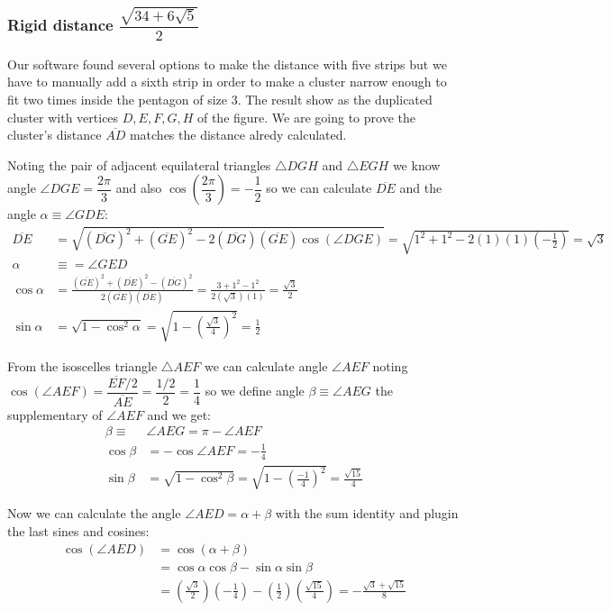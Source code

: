 \documentclass[11pt]{article}
\begin{document}
\subsubsection{Rigid distance  $\dfrac{\sqrt{34+6\sqrt5}}2$}

Our software found several options to make the distance with five strips but we have to manually add a sixth strip in order to make a cluster narrow enough to fit two times inside the pentagon of size $3$. The result show as the duplicated cluster with vertices $D,E,F,G,H$ of the figure. We are going to prove the cluster's distance $\overline{AD}$ matches the distance alredy calculated.

Noting the pair of adjacent equilateral triangles $\triangle{DGH}$ and $\triangle{EGH}$ we know angle $\angle{DGE} = \dfrac{2\pi}3$ and also $\cos\left(\dfrac{2\pi}3\right) = -\dfrac{1}2$ so we can calculate $\overline{DE}$ and the angle $\alpha \equiv \angle{GDE}$:
\begin{align}
\overline{DE} &= \sqrt{(\overline{DG})^2 + (\overline{GE})^2 
 - 2(\overline{DG})(\overline{GE})\cos(\angle{DGE})}
 = \sqrt{1^2 + 1^2 - 2(1)(1)\left(-\frac{1}2\right)} = \sqrt3\\
\alpha &\equiv = \angle{GED} \nonumber\\
\cos\alpha &= \frac{(\overline{GE})^2 + (\overline{DE})^2 - (\overline{DG})^2}
 {2(\overline{GE})(\overline{DE})}
 = \frac{3 + 1^2 - 1^2}{2(\sqrt3)(1)} = \frac{\sqrt3}2\\
\sin\alpha &= \sqrt{1 - \cos^2\alpha} = \sqrt{1 - \left(\frac{\sqrt3}4\right)^2} 
 = \frac{1}2
\end{align}

From the isoscelles triangle $\triangle{AEF}$ we can calculate angle $\angle{AEF}$ noting $\cos(\angle{AEF}) = \dfrac{\overline{EF}/2}{\overline{AE}} = \dfrac{1/2}{2} = \dfrac{1}4$ so we define angle $\beta \equiv \angle{AEG}$ the supplementary of $\angle{AEF}$ and we get:
\begin{align}
\beta \equiv& \angle{AEG} = \pi - \angle{AEF} \nonumber\\
\cos\beta &= -\cos{\angle{AEF}} = -\frac{1}4 \\
\sin\beta &= \sqrt{1 - \cos^2\beta} = \sqrt{1 - \left(\frac{-1}4\right)^2} = \frac{\sqrt{15}}4
\end{align}

Now we can calculate the angle $\angle{AED} = \alpha + \beta$ with the sum identity and plugin the last sines and cosines:
\begin{align}
\cos(\angle{AED}) &= \cos(\alpha + \beta) \nonumber\\
 &= \cos\alpha\cos\beta - \sin\alpha\sin\beta \nonumber\\
 & = \left(\frac{\sqrt3}2\right)\left(-\frac{1}4\right) 
  - \left(\frac{1}2\right)\left(\frac{\sqrt{15}}4\right) 
  = -\frac{\sqrt3 + \sqrt{15}}8
\end{align}
\end{document}
